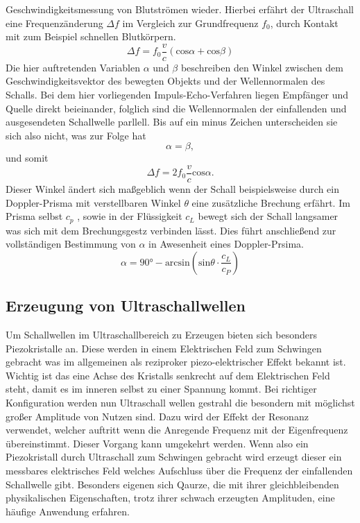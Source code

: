 Geschwindigkeitsmessung von Blutströmen wieder. Hierbei erfährt der Ultraschall eine Frequenzänderung $\Delta f$ im Vergleich zur Grundfrequenz $f_0$,
durch Kontakt mit zum Beispiel schnellen Blutkörpern. 
\begin{equation*}
  \Delta f = f_0 \frac{v}{c} \left ( \text{cos}\alpha + \text{cos}\beta \right )
\end{equation*}
Die hier auftretenden Variablen $\alpha$ und $\beta$ beschreiben den Winkel zwischen dem Geschwindigkeitsvektor des bewegten Objekts
und der Wellennormalen des Schalls. Bei dem hier vorliegenden Impuls-Echo-Verfahren liegen Empfänger und Quelle direkt beieinander, folglich sind 
die Wellennormalen der einfallenden und ausgesendeten Schallwelle parllell. Bis auf ein minus Zeichen unterscheiden sie sich also nicht, was zur Folge hat
\begin{equation*}
    \alpha = \beta,
\end{equation*}
und somit
\begin{equation}
    \label{eqn:deltaf}
    \Delta f = 2 f_0 \frac{v}{c} \text{cos}\alpha.
\end{equation}
Dieser Winkel ändert sich maßgeblich wenn der Schall beispielsweise durch ein Doppler-Prisma mit verstellbaren Winkel $\theta$ eine zusätzliche Brechung erfährt.
Im Prisma selbst $c_p$ \cite{....}, sowie in der Flüssigkeit $c_L$ \cite{....} bewegt sich der Schall  langsamer  was sich mit dem Brechungsgestz verbinden lässt. Dies 
führt anschließend zur vollständigen Bestimmung von $\alpha$ in Awesenheit eines Doppler-Prsima. 
\begin{equation}
    \label{eqn:alphafinal}
    \alpha = 90 \si{\degree} - \text{arcsin} \left( \text{sin}\theta \cdot \frac{c_L}{c_P} \right)
\end{equation}

\subsection{Erzeugung von Ultraschallwellen}
Um Schallwellen im Ultraschallbereich zu Erzeugen bieten sich besonders Piezokristalle an. Diese werden in einem Elektrischen Feld 
zum Schwingen gebracht was im allgemeinen als reziproker piezo-elektrischer Effekt bekannt ist. Wichtig ist das eine Achse des Kristalls
senkrecht auf dem Elektrischen Feld steht, damit es im inneren selbst zu einer Spannung kommt. Bei richtiger Konfiguration werden nun 
Ultraschall wellen gestrahl die besondern mit möglichst großer Amplitude von Nutzen sind. 
Dazu wird der Effekt der Resonanz verwendet, welcher auftritt wenn die Anregende Frequenz mit der Eigenfrequenz übereinstimmt.
Dieser Vorgang kann umgekehrt werden. Wenn also ein Piezokristall durch Ultraschall zum Schwingen gebracht wird erzeugt dieser ein messbares
elektrisches Feld welches Aufschluss über die Frequenz der einfallenden Schallwelle gibt. 
Besonders eigenen sich Qaurze, die mit ihrer gleichbleibenden physikalischen Eigenschaften, trotz ihrer schwach erzeugten Amplituden,
eine häufige Anwendung erfahren. 
